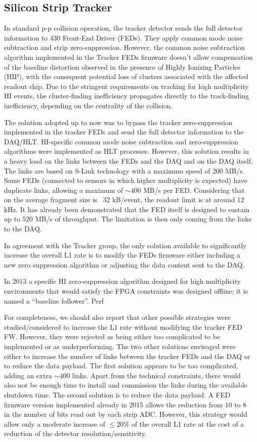 \subsection{Silicon Strip Tracker\label{subsec:SiTracker}} 
In standard p-p collision operation, the tracker detector sends the full detector information to 430 Front-End Driver (FEDs). 
They apply common mode noise subtraction and strip zero-suppression. However, the common noise subtraction algorithm implemented in the Tracker FEDs firmware doesn't allow
compensation of the baseline distortion observed in the presence of Highly Ionizing Particles (HIP), with the consequent
potential loss of clusters associated with the affected readout chip. Due to the stringent requirements on tracking for
high multiplicity HI events, the cluster-finding inefficiency propagates directly to the track-finding inefficiency,
depending on the centrality of the collision.

The solution adopted up to now was to bypass the tracker zero-suppression implemented in the tracker FEDs and send the
full detector information to the DAQ/HLT. HI-specific common mode noise subtraction and zero-suppression algorithms were
implemented as HLT processes. However, this solution results in a heavy load on the links between the FEDs and the DAQ
and on the DAQ itself. The links are based on S-Link technology with a maximum speed of 200 MB/s. Some FEDs (connected
to sensors in which higher multiplicity is expected) have duplicate links, allowing a maximum of $\sim 400$ MB/s per
FED.  Considering that on the average fragment size is ~32 kB/event, the readout limit is at around 12 kHz. It has
already been demonstrated that the FED itself is designed to sustain up to 520 MB/s of throughput. The limitation is
then only coming from the links to the DAQ.

In agreement with the Tracker group, the only solution available to significantly increase the overall L1 rate is to
modify the FEDs firmware either including a new zero suppression algorithm or adjusting the data content sent to the DAQ. 

In 2013 a specific HI zero-suppression algorithm designed for high multiplicity environments that would satisfy the FPGA
constraints was designed offline; it is named a ``baseline follower''. Perf  

For completeness, we should also report that other possible strategies were studied/considered to increase the L1 rate
without modifying the tracker FED FW. However, they were rejected as being either too complicated to be implemented or
as underperforming. The two other solutions envisaged were either to increase the number of links between the tracker
FEDs and the DAQ or to reduce the data payload. The first solution appears to be too complicated, adding an extra $\sim
400$ links. Apart from the technical constraints, there would also not be enough time to install and commission the
links during the available shutdown time. The second solution is to reduce the data payload. A FED firmware version
implemented already in 2015 allows the reduction from 10 to 8 in the number of bits read out by each strip ADC. However,
this strategy would allow only a moderate increase of $\le 20 \%$ of the overall L1 rate at the cost of a reduction of
the detector resolution/sensitivity. 
